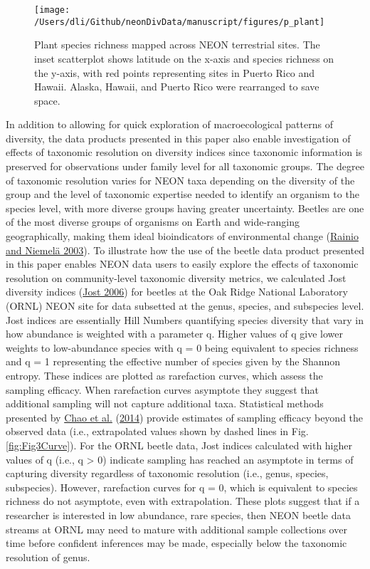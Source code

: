 \documentclass[
  12pt,
]{article}
\begin{document}
\begin{figure}

{\centering \texttt{[image: /Users/dli/Github/neonDivData/manuscript/figures/p\_plant]} 

}

\caption{Plant species richness mapped across NEON terrestrial sites. The inset scatterplot shows latitude on the x-axis and species richness on the y-axis, with red points representing sites in Puerto Rico and Hawaii. Alaska, Hawaii, and Puerto Rico were rearranged to save space.}\label{fig:Fig2Map}
\end{figure}

In addition to allowing for quick exploration of macroecological patterns of diversity, the data products presented in this paper also enable investigation of effects of taxonomic resolution on diversity indices since taxonomic information is preserved for observations under family level for all taxonomic groups. The degree of taxonomic resolution varies for NEON taxa depending on the diversity of the group and the level of taxonomic expertise needed to identify an organism to the species level, with more diverse groups having greater uncertainty. Beetles are one of the most diverse groups of organisms on Earth and wide-ranging geographically, making them ideal bioindicators of environmental change (\protect\hyperlink{ref-rainio2003ground}{Rainio and Niemelä 2003}). To illustrate how the use of the beetle data product presented in this paper enables NEON data users to easily explore the effects of taxonomic resolution on community-level taxonomic diversity metrics, we calculated Jost diversity indices (\protect\hyperlink{ref-jost2006entropy}{Jost 2006}) for beetles at the Oak Ridge National Laboratory (ORNL) NEON site for data subsetted at the genus, species, and subspecies level. Jost indices are essentially Hill Numbers quantifying species diversity that vary in how abundance is weighted with a parameter q. Higher values of q give lower weights to low-abundance species with q = 0 being equivalent to species richness and q = 1 representing the effective number of species given by the Shannon entropy. These indices are plotted as rarefaction curves, which assess the sampling efficacy. When rarefaction curves asymptote they suggest that additional sampling will not capture additional taxa. Statistical methods presented by \protect\hyperlink{ref-chao2014rarefaction}{Chao et al.} (\protect\hyperlink{ref-chao2014rarefaction}{2014}) provide estimates of sampling efficacy beyond the observed data (i.e., extrapolated values shown by dashed lines in Fig. \ref{fig:Fig3Curve}). For the ORNL beetle data, Jost indices calculated with higher values of q (i.e., q \textgreater{} 0) indicate sampling has reached an asymptote in terms of capturing diversity regardless of taxonomic resolution (i.e., genus, species, subspecies). However, rarefaction curves for q = 0, which is equivalent to species richness do not asymptote, even with extrapolation. These plots suggest that if a researcher is interested in low abundance, rare species, then NEON beetle data streams at ORNL may need to mature with additional sample collections over time before confident inferences may be made, especially below the taxonomic resolution of genus.
\end{document}
